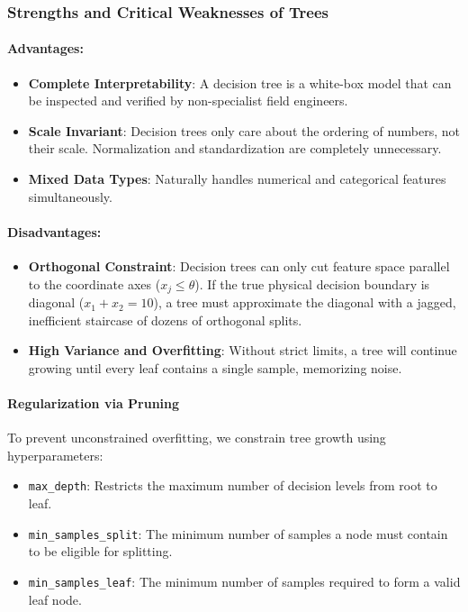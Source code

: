 \subsubsection{Strengths and Critical Weaknesses of Trees}
\paragraph{Advantages:}
\begin{itemize}
    \item \textbf{Complete Interpretability}: A decision tree is a white-box model that can be inspected and verified by non-specialist field engineers.
    \item \textbf{Scale Invariant}: Decision trees only care about the ordering of numbers, not their scale. Normalization and standardization are completely unnecessary.
    \item \textbf{Mixed Data Types}: Naturally handles numerical and categorical features simultaneously.
\end{itemize}

\paragraph{Disadvantages:}
\begin{itemize}
    \item \textbf{Orthogonal Constraint}: Decision trees can only cut feature space parallel to the coordinate axes ($x_j \le \theta$). If the true physical decision boundary is diagonal ($x_1 + x_2 = 10$), a tree must approximate the diagonal with a jagged, inefficient staircase of dozens of orthogonal splits.
    \item \textbf{High Variance and Overfitting}: Without strict limits, a tree will continue growing until every leaf contains a single sample, memorizing noise.
\end{itemize}

\paragraph{Regularization via Pruning}
To prevent unconstrained overfitting, we constrain tree growth using hyperparameters:
\begin{itemize}
    \item \texttt{max\_depth}: Restricts the maximum number of decision levels from root to leaf.
    \item \texttt{min\_samples\_split}: The minimum number of samples a node must contain to be eligible for splitting.
    \item \texttt{min\_samples\_leaf}: The minimum number of samples required to form a valid leaf node.
\end{itemize}

